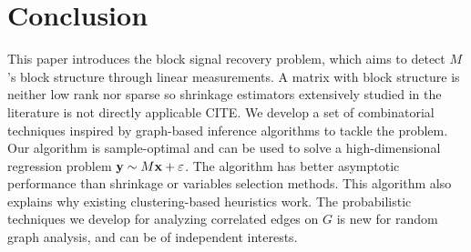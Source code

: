 \section{Conclusion}
This paper introduces the block signal recovery problem, which aims to detect $M$'s block structure through linear measurements. A matrix with block structure is neither low rank nor sparse so shrinkage estimators extensively studied in the literature is not directly applicable CITE. We develop a set of combinatorial techniques inspired by graph-based inference algorithms to tackle the problem. Our algorithm is sample-optimal and can be used to solve a high-dimensional regression problem $\mathbf{y} \sim M \mathbf{x} + \varepsilon$. The algorithm has better asymptotic performance than shrinkage or variables selection methods. This algorithm also explains why existing clustering-based heuristics work. The probabilistic techniques we develop for analyzing correlated edges on $G$ is new for random graph analysis, and can be of independent interests.  